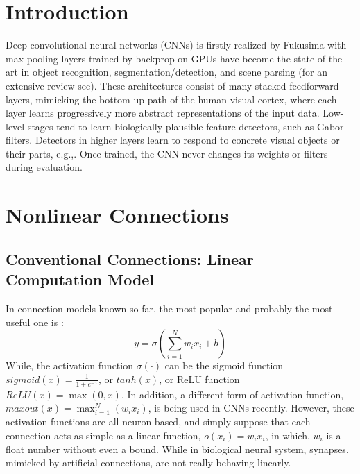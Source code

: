\documentclass[conference]{IEEEtran}
\begin{document}
\section{Introduction}
Deep convolutional neural networks (CNNs) is firstly realized by Fukusima \cite{fukushima1979neural} with
max-pooling layers\cite{weng1992cresceptron} trained by
backprop\cite{lecun1989backpropagation} on GPUs\cite{ciresan2011flexible}
have become the state-of-the-art in object recognition\cite{ciregan2012multi,
krizhevsky2012imagenet,goodfellow2013maxout,lin2013network},
segmentation/detection\cite{cirecsan2013mitosis,ciresan2012deep}, and scene
parsing\cite{farabet2013learning,sermanet2013pedestrian}
(for an extensive review see\cite{schmidhuber2015deep}). These architectures
consist of many stacked feedforward layers, mimicking the bottom-up path of
the human visual cortex, where each layer learns progressively more abstract
representations of the input data. Low-level stages tend to learn biologically
plausible feature detectors, such as Gabor filters\cite{gabor1946theory}.
Detectors in higher layers learn to respond to concrete visual objects or
their parts, e.g.,\cite{zeiler2014visualizing}. Once trained, the CNN never
changes its weights or filters during evaluation.

\section{Nonlinear Connections}
\subsection{Conventional Connections: Linear Computation Model}
In connection models known so far,
the most popular and probably the most useful one \cite{jain1996artificial} is :
$$ y=\sigma\left(\sum_{i=1}^{N}w_ix_i+b\right) $$
While, the activation function $\sigma(\cdot)$ can be the sigmoid function
$sigmoid(x)=\frac{1}{1+e^{-x}}$, or $tanh(x)$,
or ReLU function $ReLU(x)=\max(0,x)$\cite{nair2010rectified}.
In addition,
a different form of activation function, $maxout(x)=\max_{i=1}^N(w_ix_i)$,
is being used in CNNs recently\cite{goodfellow2013maxout}.
However, these activation functions are all neuron-based, and simply suppose
that each connection acts as simple as a linear function, $o(x_i)=w_ix_i$,
in which, $w_i$ is a float number without even a bound. While in biological
neural system, synapses, mimicked by artificial connections, are not really
behaving linearly.
\end{document}

